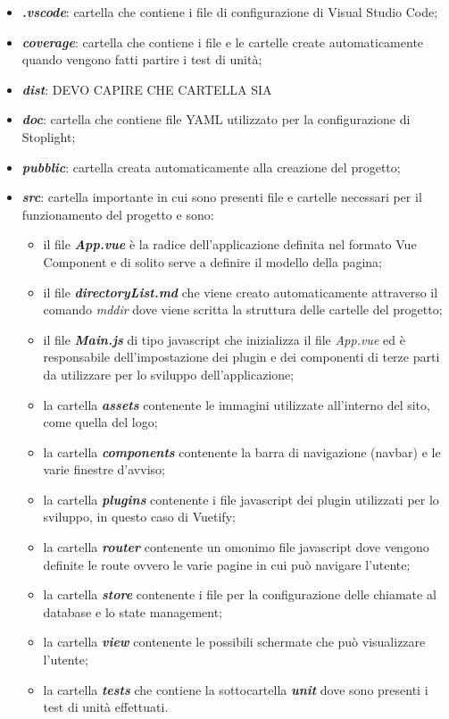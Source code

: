\begin{itemize}
	\item \textbf{\textit{.vscode}}: cartella che contiene i file di configurazione di Visual Studio Code;
	\item \textbf{\textit{coverage}}: cartella che contiene i file e le cartelle create automaticamente quando vengono fatti partire i test di unità;
	\item \textbf{\textit{dist}}: DEVO CAPIRE CHE CARTELLA SIA
	\item \textbf{\textit{doc}}: cartella che contiene file YAML utilizzato per la configurazione di Stoplight;
	\item \textbf{\textit{pubblic}}: cartella creata automaticamente alla creazione del progetto;
	\item \textbf{\textit{src}}: cartella importante in cui sono presenti file e cartelle necessari per il funzionamento del progetto e sono:
	\begin{itemize}
		\item il file \textbf{\textit{App.vue}} è la radice dell'applicazione definita nel formato Vue Component e di solito serve a definire il modello della pagina;
		\item il file \textbf{\textit{directoryList.md}} che viene creato automaticamente attraverso il comando \textit{mddir} dove viene scritta la struttura delle cartelle del progetto;
		\item il file \textbf{\textit{Main.js}} di tipo javascript che inizializza il file \textit{App.vue} ed è responsabile dell'impostazione dei plugin e dei componenti di terze parti da utilizzare per lo sviluppo dell'applicazione;
		\item la cartella \textbf{\textit{assets}} contenente le immagini utilizzate all'interno del sito, come quella del logo;
		\item la cartella \textbf{\textit{components}} contenente la barra di navigazione (navbar) e le varie finestre d'avviso;
		\item la cartella \textbf{\textit{plugins}} contenente i file javascript dei plugin utilizzati per lo sviluppo, in questo caso di Vuetify;
		\item la cartella \textbf{\textit{router}} contenente un omonimo file javascript dove vengono definite le route ovvero le varie pagine in cui può navigare l'utente;
		\item la cartella \textbf{\textit{store}} contenente i file per la configurazione delle chiamate al database e lo state management;
		\item la cartella \textbf{\textit{view}} contenente le possibili schermate che può visualizzare l'utente;
		\item la cartella \textbf{\textit{tests}} che contiene la sottocartella \textbf{\textit{unit}} dove sono presenti i test di unità effettuati.
	\end{itemize}
\end{itemize}

